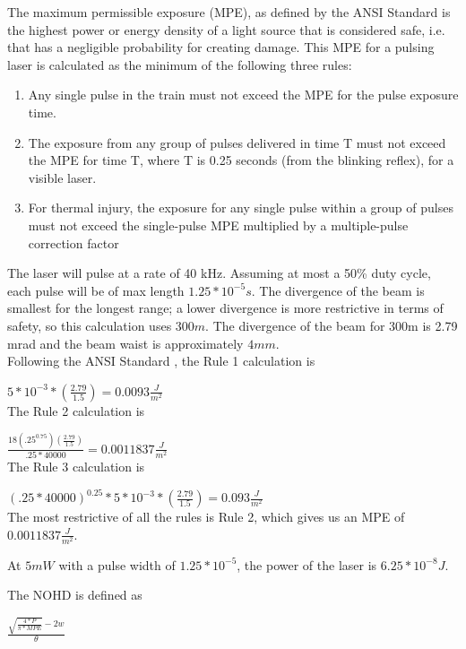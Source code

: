 \documentclass[letterpaper,10pt]{article}
\begin{document}
\begin{spacing}{1.15}
The maximum permissible exposure (MPE), as defined by the ANSI Standard \cite{ANSI} is the highest power or energy density of a light source that is considered safe, i.e. that has a negligible probability for creating damage. This MPE for a pulsing laser is calculated as the minimum of the following three rules:

\begin{enumerate}
	\item Any single pulse in the train must not exceed the MPE for the pulse exposure time.
	\item The exposure from any group of pulses delivered in time T must not exceed the MPE for
	time T, where T is 0.25 seconds (from the blinking reflex), for a visible laser. 
	\item For thermal injury, the exposure for any single pulse within a group of pulses must not
	exceed the single-pulse MPE multiplied by a multiple-pulse correction factor
\end{enumerate}

The laser will pulse at a rate of 40 kHz. Assuming at most a 50\% duty cycle, each pulse will be of max length $1.25*10^{-5} s$. The divergence of the beam is smallest for the longest range; a lower divergence is more restrictive in terms of safety, so this calculation uses $300m$. The divergence of the beam for 300m is 2.79 mrad and the beam waist is approximately $4 mm$. \\

Following the ANSI Standard \cite{ANSI}, the Rule 1 calculation is 

{\large $5*10^{-3}*(\frac{2.79}{1.5})  = 0.0093 \frac{J}{m^2}$ }\\

The Rule 2 calculation is

{\large $\frac{18(.25^{0.75})(\frac{2.79}{1.5})}{.25*40000} = 0.0011837 \frac{J}{m^2}$ }\\

The Rule 3 calculation is

{\large $(.25*40000)^{0.25} * 5*10^{-3}*(\frac{2.79}{1.5}) = 0.093 \frac{J}{m^2}$ }\\

The most restrictive of all the rules is Rule 2, which gives us an MPE of $0.0011837 \frac{J}{m^2}$.

At $5mW$ with a pulse width of $1.25*10^{-5}$, the power of the laser is $6.25*10^{-8} J$. 

The NOHD is defined as

{\LARGE $ \frac{\sqrt{\frac{4 * P}{\pi * MPE}} - 2w}{\theta}$}


\end{spacing}
\end{document}
